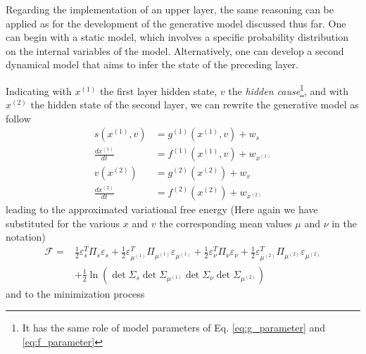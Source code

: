\documentclass[10pt]{article}
\begin{document}
Regarding the implementation of an upper layer, the same reasoning can be applied as for the development of the generative model discussed thus far. One can begin with a static model, which involves a specific probability distribution on the internal variables of the model. 
Alternatively, one can develop a second dynamical model that aims to infer the state of the preceding layer. 

Indicating with $x^{(1)}$ the first layer hidden state, $v$ the \emph{hidden cause}\footnote{It has the same role of model parameters of Eq. \ref{eq:g_parameter} and \ref{eq:f_parameter}}, and with $x^{(2)}$ the hidden state of the second layer, we can rewrite the generative model as follow
\begin{equation}
    \begin{split}
        s(x^{(1)}, v) &= g^{(1)}(x^{(1)}, v) + w_{s} \\
        \frac{d x^{(1)}}{dt} &= f^{(1)}(x^{(1)}, v) + w_{x^{(1)}} \\
        v(x^{(2)}) &= g^{(2)}(x^{(2)}) + w_v \\
        \frac{d x^{(2)}}{dt} &= f^{(2)}(x^{(2)}) + w_{x^{(2)}}
    \end{split}
\end{equation}
leading to the approximated variational free energy (Here again we have substituted for the various $x$ and $v$ the corresponding mean values $\mu$ and $\nu$ in the notation)
\begin{equation}
\begin{split}
    \mathcal{F} = &\frac{1}{2}\varepsilon_s^T \Pi_s \varepsilon_s + \frac{1}{2}\varepsilon_{\mu^{(1)}}^T \Pi_{\mu^{(1)}} \varepsilon_{\mu^{(1)}} + \frac{1}{2}\varepsilon_\nu^T \Pi_\nu \varepsilon_\nu + \frac{1}{2}\varepsilon_{\mu^{(2)}}^T \Pi_{\mu^{(2)}} \varepsilon_{\mu^{(2)}} \\
    & + \frac{1}{2} \ln(\det \Sigma_s \det \Sigma_{\mu^{(1)}} \det \Sigma_{\nu} \det \Sigma_{\mu^{(2)}})
\end{split}
\end{equation}
and to the minimization process
\end{document}
